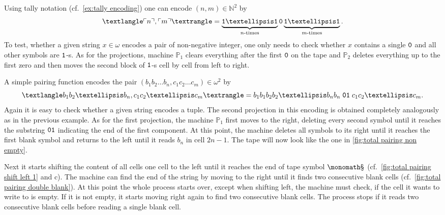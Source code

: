 \begin{exam}
  \begin{exlist}
    \item\label{ex:tally pairing}
    Using tally notation (cf.~\cref{ex:tally encoding}) one can encode \((n, m)
    ∈ ℕ^2\) by
    \[
      ⟨\enc{n}, \enc{m}⟩ =
        \underbrace{\one … \one}_{n\text{-times}} \zer
        \underbrace{\one … \one}_{m\text{-times}}.
    \]
    To test, whether a given string \(x ∈ ω\) encodes a pair of non-negative
    integer, one only needs to check whether \(x\) contains a single \(\mathtt{0}\)
    and all other symbols are \(\mathtt{1}\)-s. As for the projections, machine
    \(\mathbb{P}_1\) clears everything after the first \(\mathtt{0}\) on the tape and
    \(\mathbb{P}_2\) deletes everything up to the first zero and then moves the
    second block of \(\mathtt{1}\)-s cell by cell from left to right.

    \item\label{ex:total pairing}
    A simple pairing function encodes the pair \((b_1b_2…b_n, c_1c_2…c_m) ∈ ω^2\)
    by
    \[
      ⟨b_1b_2…b_n, c_1c_2…c_m⟩ = b_1b_1b_2b_2…b_nb_n \; \zer\one \; c_1c_2…c_m.
    \]
    Again it is easy to check whether a given string encodes a tuple. The second
    projection in this encoding is obtained completely analogously as in the
    previous example. As for the first projection, the machine \(\mathbb{P}_1\)
    first moves to the right, deleting every second symbol until it reaches the
    substring \(\mathtt{0}\mathtt{1}\) indicating the end of the first component. At this
    point, the machine deletes all symbols to its right until it reaches the
    first blank symbol and returns to the left until it reads \(b_n\) in cell
    \(2n - 1\). The tape will now look like the one in \cref{fig:total pairing
    non empty}.

    Next it starts shifting the content of all cells one cell to the left until
    it reaches the end of tape symbol \(\sta\) (cf.~\cref{fig:total pairing
    shift left 1} and c). The machine can find the end of the string by moving
    to the right until it finds two consecutive blank cells (cf.~\cref{fig:total
    pairing double blank}). At this point the whole process starts over, except
    when shifting left, the machine must check, if the cell it wants to write to
    is empty. If it is not empty, it starts moving right again to find two
    consecutive blank cells. The process stops if it reads two consecutive blank
    cells before reading a single blank cell.
  \end{exlist}
\end{exam}

